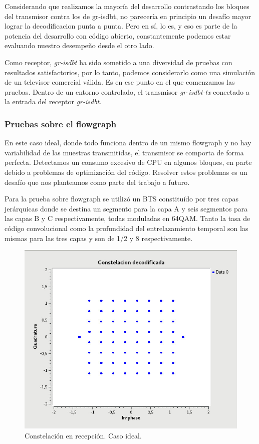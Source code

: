 Considerando que realizamos la mayoría del desarrollo contrastando los bloques del transmisor contra los de gr-isdbt, no parecería en principio un desafío mayor lograr la decodificacion punta a punta. Pero en sí, lo es, y eso es parte de la potencia del desarrollo con código abierto, constantemente podemos estar evaluando nuestro desempeño desde el otro lado. 

Como receptor, \textit{gr-isdbt} ha sido sometido a una diversidad de pruebas con resultados satisfactorios, por lo tanto, podemos considerarlo como una simulación de un televisor comercial válida. Es en ese punto en el que comenzamos las pruebas. Dentro de un entorno controlado, el transmisor \textit{gr-isdbt-tx} conectado a la entrada del receptor \textit{gr-isdbt}.

\subsubsection{Pruebas sobre el flowgraph}

En este caso ideal, donde todo funciona dentro de un mismo flowgraph y no hay variabilidad de las muestras transmitidas, el transmisor se comporta de forma perfecta. Detectamos un consumo excesivo de CPU en algunos bloques, en parte debido a problemas de optimización del código. Resolver estos problemas es un desafío que nos planteamos como parte del trabajo a futuro.

Para la prueba sobre flowgraph se utilizó un BTS constituído por tres capas jerárquicas donde se destina un segmento para la capa A y seis segmentos para las capas B y C respectivamente, todas moduladas en 64QAM. Tanto la tasa de código convolucional como la profundidad del entrelazamiento temporal son las mismas para las tres capas y son de 1/2 y 8 respectivamente. 

\begin{figure}[!h]
	\centering
	\includegraphics[scale=0.5]{figuras/cap06/const_rec}
	\caption{\label{f:const_rec} Constelación en recepción. Caso ideal.}
\end{figure}

